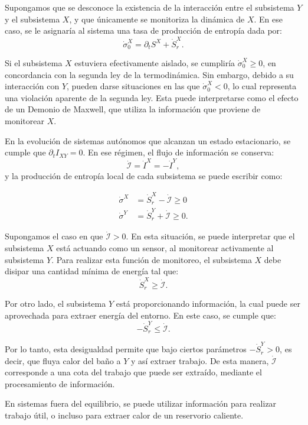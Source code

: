 Supongamos que se desconoce la existencia de la interacción entre el subsistema \( Y \) y el subsistema \( X \), y que únicamente se monitoriza la dinámica de \( X \). En ese caso, se le asignaría al sistema una tasa de producción de entropía dada por:
\[
\dot{\sigma}^{X}_0 = \partial_t S^X + \dot{S}_r^X.
\]

Si el subsistema \( X \) estuviera efectivamente aislado, se cumpliría \( \dot{\sigma}^{X}_0 \geq 0 \), en concordancia con la segunda ley de la termodinámica. Sin embargo, debido a su interacción con \( Y \), pueden darse situaciones en las que \( \dot{\sigma}^{X}_0 < 0 \), lo cual representa una violación aparente de la segunda ley. Esta puede interpretarse como el efecto de un Demonio de Maxwell, que utiliza la información que proviene de monitorear \(X \).

En la evolución de sistemas autónomos que alcanzan un estado estacionario, se cumple que \( \partial_t I_{XY} = 0 \). En ese régimen, el flujo de información se conserva:
\[
\dot{\mathcal{I}} = \dot{I}^{X} = -\dot{I}^{Y},
\]
y la producción de entropía local de cada subsistema se puede escribir como:


\begin{align*}
    \dot{\sigma}^{X} & = \dot{S}_{r}^{X} - \dot{\mathcal{I}} \geq 0 \\
    \dot{\sigma}^{Y} & =  \dot{S}_{r}^{Y} + \dot{\mathcal{I}} \geq 0 . 
\end{align*}

Supongamos el caso en que \( \dot{\mathcal{I}} > 0 \). En esta situación, se puede interpretar que el subsistema \( X \) está actuando como un sensor, al monitorear activamente al subsistema \( Y \). Para realizar esta función de monitoreo, el subsistema \( X \) debe disipar una cantidad mínima de energía tal que:
\[
\dot{S}_{r}^{X} \geq \dot{\mathcal{I}}.
\]

Por otro lado, el subsistema \( Y \) está proporcionando información, la cual puede ser aprovechada para extraer energía del entorno. En este caso, se cumple que:
\[
-\dot{S}_{r}^{Y} \leq \dot{\mathcal{I}}.
\]

Por lo tanto, esta desigualdad permite que bajo ciertos parámetros $-\dot{S}^{Y}_{r}>0$, es decir, que fluya calor del baño a $Y$ y así extraer trabajo. De esta manera, $\dot{\mathcal{I}}$ corresponde a una cota del trabajo que puede ser extraído, mediante el procesamiento de información.

En sistemas fuera del equilibrio, se puede utilizar información para realizar trabajo útil, o incluso para extraer calor de un reservorio caliente.

